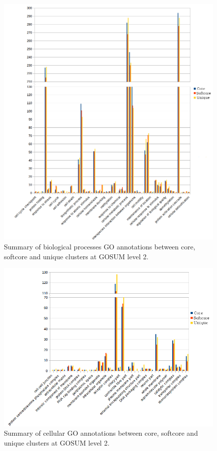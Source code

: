 \documentclass[12pt]{article}
\begin{document}
\begin{figure} 
\includegraphics[scale=.75]{3Aug18_cluster-investigation/figures/gosum-pan/Pan-gosum2-bio-split.png} 
\caption{Summary of biological processes GO annotations between core, softcore and unique clusters at GOSUM level 2.} 
\label{fig:PanGo2Bio}
\end{figure} 
\FloatBarrier

\begin{figure} 
\includegraphics[scale=.8]{3Aug18_cluster-investigation/figures/gosum-pan/Pan-gosum2-cell-split.png} 
\caption{Summary of cellular GO annotations between core, softcore and unique clusters at GOSUM level 2.} 
\label{fig:PanGo2Cell}
\end{figure} 
\FloatBarrier
\end{document}
